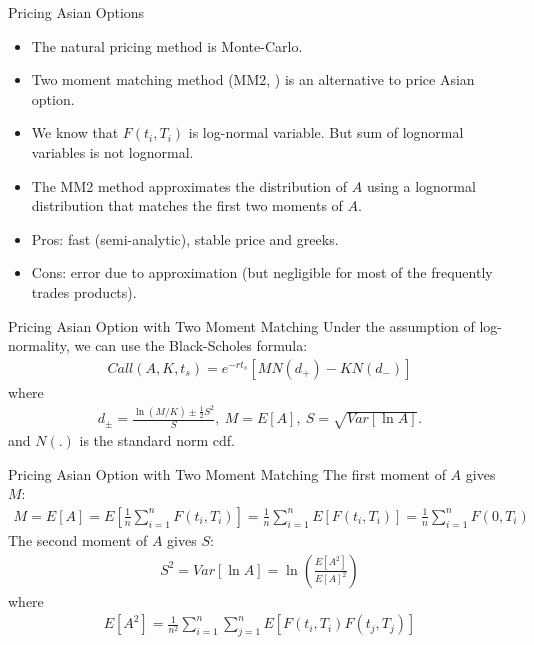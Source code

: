 \documentclass[11pt]{beamer}
\begin{document}
\begin{frame}{Pricing Asian Options}
\begin{itemize}
\item The natural pricing method is Monte-Carlo.  
\item Two moment matching method (MM2, \cite{turnbull_wakeman1991_mm2}) is an alternative to price Asian option.
\item We know that $F(t_i, T_i)$ is log-normal variable.
But sum of lognormal variables is not lognormal.
\item The MM2 method approximates the distribution of $A$ using a lognormal distribution 
that matches the first two moments of $A$. 
\item Pros: fast (semi-analytic), stable price and greeks. 
\item Cons: error due to approximation (but negligible for most of the frequently trades products).

\end{itemize}
\end{frame}


\begin{frame}{Pricing Asian Option with Two Moment Matching}
Under the assumption of log-normality, we can use the Black-Scholes formula:
\begin{align*}
Call(A, K, t_s) = e^{-rt_s}[M N(d_+) - KN(d_-)]
\end{align*}
where
\begin{align*}
d_{\pm} = \frac{\ln (M/K) \pm \frac{1}{2}S^2}{S}, 
~M = E[A], ~S=\sqrt{Var[\ln A]}.
\end{align*}
and $N(.)$ is the standard norm cdf.
\end{frame}

\begin{frame}{Pricing Asian Option with Two Moment Matching}
The first moment of $A$ gives $M$:
\begin{align*}
M = E[A] = E[\frac{1}{n}\sum_{i=1}^n F(t_i, T_i)] = \frac{1}{n}\sum_{i=1}^n E[F(t_i, T_i)] = \frac{1}{n} \sum_{i=1}^n F(0, T_i)
\end{align*}
The second moment of $A$ gives $S$:
\begin{align*}
S^2 = Var[\ln A] = \ln \left( \frac{E[A^2]}{E[A]^2} \right)
\end{align*}
where
\begin{align}
E[A^2] = \frac{1}{n^2}\sum_{i=1}^n \sum_{j=1}^n E[F(t_i, T_i) F(t_j, T_j)] 
\label{eq:sec-moment}
\end{align}

\end{frame}
\end{document}
